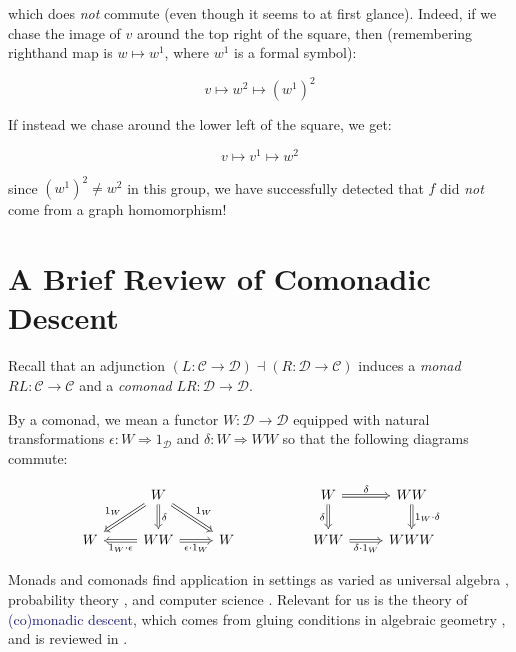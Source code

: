 \documentclass[12pt]{article}
\theoremstyle{definition}
\theoremstyle{theorem}
\newcommand*{\catVarFont}[1]{\mathcal{#1}}
\newcommand{\catC}{\catVarFont{C}}
\newcommand{\catD}{\catVarFont{D}}
\newcommand*{\important}[1]{\textcolor{MidnightBlue}{#1}}
\begin{document}
which does \emph{not} commute (even though it seems to at first glance). 
Indeed, if we chase the image of $v$ around the top right of the square, then
(remembering righthand map is $w \mapsto w^1$, where $w^1$ is a formal symbol):

\[ v \mapsto w^2 \mapsto (w^1)^2 \]

If instead we chase around the lower left of the square, we get:

\[ v \mapsto v^1 \mapsto w^2 \]

since $(w^1)^2 \neq w^2$ in this group, we have successfully detected that 
$f$ did \emph{not} come from a graph homomorphism!

\section{A Brief Review of Comonadic Descent}
\label{review}

Recall that an adjunction
$(L : \catC \to \catD) \dashv (R : \catD \to \catC)$
induces a \emph{monad} $RL : \catC \to \catC$ and a \emph{comonad}
$LR : \catD \to \catD$.

By a comonad, we mean a functor $W : \catD \to \catD$ equipped with natural
transformations $\epsilon : W \Rightarrow 1_\catD$ and $\delta : W \Rightarrow WW$
so that the following diagrams commute:

\[
    \begin{tikzcd}
    & W &&& W & WW \\
    W & WW & W && WW & WWW
    \arrow["{1_W \cdot \epsilon}", Rightarrow, from=2-2, to=2-1]
    \arrow["{\epsilon \cdot 1_W}"', Rightarrow, from=2-2, to=2-3]
    \arrow["\delta", Rightarrow, from=1-2, to=2-2]
    \arrow["{1_W}"', Rightarrow, from=1-2, to=2-1]
    \arrow["{1_W}", Rightarrow, from=1-2, to=2-3]
    \arrow["\delta"', Rightarrow, from=1-5, to=2-5]
    \arrow["\delta", Rightarrow, from=1-5, to=1-6]
    \arrow["{\delta \cdot 1_W}"', Rightarrow, from=2-5, to=2-6]
    \arrow["{1_W \cdot \delta}", Rightarrow, from=1-6, to=2-6]
    \end{tikzcd}
\]

Monads and comonads find application in settings as varied as universal algebra 
\cite{borceuxCategoriesStructures1994, 
adamekAlgebraicTheoriesCategorical2011,
bojanczykRecognisableLanguagesMonads2015,
awodeyCoalgebraicDualBirkhoff2000,
hylandCategoryTheoreticUnderstanding2007}, 
probability theory 
\cite{giryCategoricalApproachProbability1982,
culbertsonCategoricalFoundationBayesian2014,
leinsterCodensityUltrafilterMonad2013}, 
and computer science 
\cite{moggiNotionsComputationMonads1991,
depaivaDialecticaComonads2021,
ghaniAlgebrasCoalgebrasMonads2001,
ruttenUniversalCoalgebraTheory2000}.
Relevant for us is the theory of \important{(co)monadic descent}, 
which comes from gluing conditions in algebraic geometry
\cite{grothendieckTechniqueDescenteTheoremes1960}, and is reviewed in
\cite{borceuxCategoriesStructures1994}.
\end{document}
